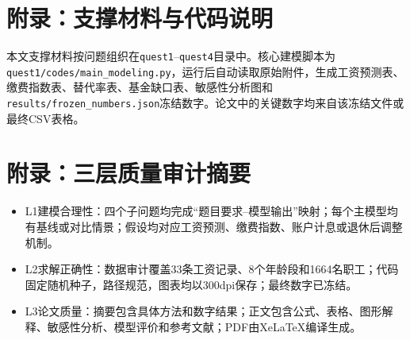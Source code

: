 \documentclass[UTF8,12pt,a4paper]{ctexart}
\begin{document}
\appendix
\section{附录：支撑材料与代码说明}
本文支撑材料按问题组织在\texttt{quest1}--\texttt{quest4}目录中。核心建模脚本为\texttt{quest1/codes/main\_modeling.py}，运行后自动读取原始附件，生成工资预测表、缴费指数表、替代率表、基金缺口表、敏感性分析图和\texttt{results/frozen\_numbers.json}冻结数字。论文中的关键数字均来自该冻结文件或最终CSV表格。

\section{附录：三层质量审计摘要}
\begin{itemize}
\item L1建模合理性：四个子问题均完成“题目要求--模型输出”映射；每个主模型均有基线或对比情景；假设均对应工资预测、缴费指数、账户计息或退休后调整机制。
\item L2求解正确性：数据审计覆盖33条工资记录、8个年龄段和1664名职工；代码固定随机种子，路径规范，图表均以300dpi保存；最终数字已冻结。
\item L3论文质量：摘要包含具体方法和数字结果；正文包含公式、表格、图形解释、敏感性分析、模型评价和参考文献；PDF由XeLaTeX编译生成。
\end{itemize}
\end{document}
